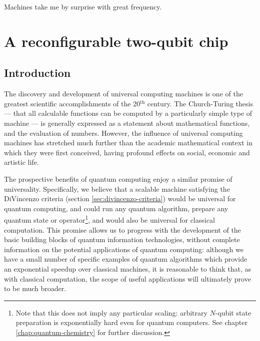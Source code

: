\begin{savequote}[100mm] 
Machines take me by surprise with great frequency.
\end{savequote}

\chapter{A reconfigurable two-qubit chip}
\label{chap:cnot-mz}

\section{Introduction}
\label{sec:cnot-mz-intro}
The discovery and development of universal computing machines is one of the greatest scientific accomplishments of the 20$^{\text{th}}$ century. The Church-Turing thesis --- that all calculable functions can be computed by a particularly simple type of machine --- is generally expressed as a statement about mathematical functions, and the evaluation of numbers. However, the influence of universal computing machines has stretched much further than the academic mathematical context in which they were first conceived, having profound effects on social, economic and artistic life.

The prospective benefits of quantum computing enjoy a similar promise of universality. Specifically, we believe \cite{Deutsch1985} that a scalable machine satisfying the DiVincenzo criteria (section \ref{sec:divincenzo-criteria}) would be universal for quantum computing, and could run any quantum algorithm, prepare any quantum state or operator\footnote{Note that this does not imply any particular scaling: arbitrary $N$-qubit state preparation is exponentially hard even for quantum computers. See chapter \ref{chap:quantum-chemistry} for further discussion.}, and would also be universal for classical computation. This promise allows us to progress with the development of the basic building blocks of quantum information technologies, without complete information on the potential applications of quantum computing: although we have a small number of specific examples of quantum algorithms which provide an exponential speedup over classical machines, it is reasonable to think that, as with classical computation, the scope of useful applications will ultimately prove to be much broader.

